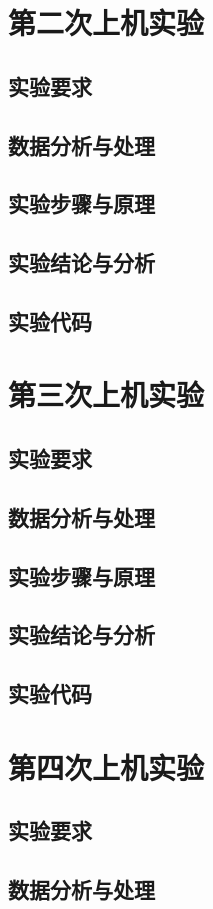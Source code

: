 \documentclass[a4paper,12pt]{report}
\begin{document}
\chapter{第二次上机实验}
\section{实验要求}
\section{数据分析与处理}
\section{实验步骤与原理}
\section{实验结论与分析}
\section{实验代码}
\clearpage
\chapter{第三次上机实验}
\section{实验要求}
\section{数据分析与处理}
\section{实验步骤与原理}
\section{实验结论与分析}
\section{实验代码}
\clearpage
\chapter{第四次上机实验}
\section{实验要求}
\section{数据分析与处理}
\end{document}
